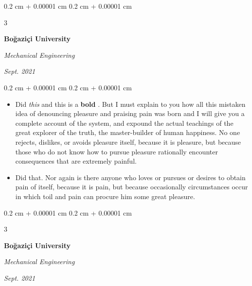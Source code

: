 \documentclass[10pt, letterpaper]{article}
\newenvironment{highlights}{
    \begin{itemize}[
        topsep=0.10 cm,
        parsep=0.10 cm,
        partopsep=0pt,
        itemsep=0pt,
        leftmargin=0.4 cm + 10pt + 0.6 cm
    ]
}{
    \end{itemize}
} %
\newenvironment{onecolentry}{
    \begin{adjustwidth}{
        0.2 cm + 0.00001 cm
    }{
        0.2 cm + 0.00001 cm
    }
}{
    \end{adjustwidth}
} %
\newenvironment{threecolentry}[3][]{
    \onecolentry
    \def\thirdColumn{#3}
    \setcolumnwidth{0.6 cm, \fill, 4.5 cm}
    \begin{paracol}{3}
    #2 \switchcolumn
}{
    \switchcolumn \raggedleft \thirdColumn
    \end{paracol}
    \endonecolentry
} %
\let\hrefWithoutArrow\href
\renewcommand{\href}[2]{\hrefWithoutArrow{#1}{\mbox{\ifthenelse{\equal{#2}{}}{ }{#2 }\raisebox{.15ex}{\footnotesize \faExternalLink*}}}}
\begin{document}
        \vspace{0.2 cm-3px}

        \begin{threecolentry}{
            \vspace*{\fill}
            \textbullet
            \vspace*{3px}
            \vspace*{\fill}
        }{
            
            
        \textit{Sept. 2021}}
            \textbf{Boğaziçi University}

            \textit{Mechanical Engineering}
        \end{threecolentry}

        \vspace{0.10 cm-3px}
        \begin{onecolentry}
            \begin{highlights}
                \item Did \textit{this} and this is a \textbf{bold} \href{https://example.com}{link}. But I must explain to you how all this mistaken idea of denouncing pleasure and praising pain was born and I will give you a complete account of the system, and expound the actual teachings of the great explorer of the truth, the master-builder of human happiness. No one rejects, dislikes, or avoids pleasure itself, because it is pleasure, but because those who do not know how to pursue pleasure rationally encounter consequences that are extremely painful.
                \item Did that. Nor again is there anyone who loves or pursues or desires to obtain pain of itself, because it is pain, but because occasionally circumstances occur in which toil and pain can procure him some great pleasure.
            \end{highlights}
        \end{onecolentry}


        \vspace{0.2 cm-3px}

        \begin{threecolentry}{
            \vspace*{\fill}
            \textbullet
            \vspace*{3px}
            \vspace*{\fill}
        }{
            
            
        \textit{Sept. 2021}}
            \textbf{Boğaziçi University}

            \textit{Mechanical Engineering}
        \end{threecolentry}
\end{document}
